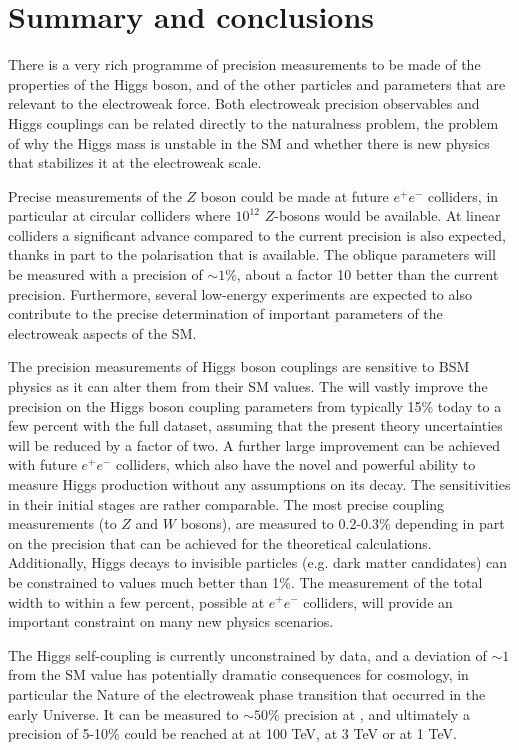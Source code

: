 \documentclass[../report.tex]{subfiles}
\newcommand{\ew}{electroweak\xspace}
\newcommand{\epem}{e^{+}e^{-}}
\begin{document}
\section{Summary and conclusions}
There is a very rich programme of precision measurements to be made of the properties of the Higgs boson, and of the other particles and parameters that are relevant to the \ew force. Both \ew precision observables and Higgs couplings can be related directly to the naturalness problem, the problem of why the Higgs mass is unstable in the SM and whether there is new physics that stabilizes it at the \ew scale. 

Precise measurements of the $Z$ boson could be made at future $\epem$ colliders, in particular at circular colliders where $10^{12}$ $Z$-bosons would be available. At linear colliders a significant advance compared to the current precision is also expected, thanks in part to the polarisation that is available. The oblique parameters will be measured with a precision of $\sim 1\%$, about a factor 10 better than the current precision. Furthermore, several low-energy experiments are expected to also contribute to the precise determination of important parameters of the \ew aspects of the SM.

The precision measurements of Higgs boson couplings are sensitive to BSM physics as it can alter them from their SM values. The \HLLHC will vastly improve the precision on the Higgs boson coupling parameters from typically 15\% today to a few percent with the full dataset, assuming that the present theory uncertainties will be reduced by a factor of two.  A further large improvement can be achieved with future $e^+e^-$ colliders, which also have the novel and powerful ability to measure Higgs production without any assumptions on its decay. The sensitivities in their initial stages are rather comparable. The most precise coupling measurements (to $Z$ and $W$ bosons), are measured to 0.2-0.3\% depending in part on the precision that can be achieved for the theoretical calculations. Additionally, Higgs decays to invisible particles (e.g. dark matter candidates) can be constrained to values much better than 1\%. The measurement of the total width to within a few percent, possible at $e^+e^-$ colliders, will provide an important constraint on many new physics scenarios.

The Higgs self-coupling is currently unconstrained by data, and a deviation of $\sim 1$ from the SM value has potentially dramatic consequences for cosmology, in particular the Nature of the \ew phase transition that occurred in the early Universe. It can be measured to $\sim 50\%$ precision at \HLLHC, and ultimately a precision of 5-10\% could be reached at \FCChh at 100 TeV, \CLIC at 3 TeV or \ILC at 1 TeV. 
\end{document}
